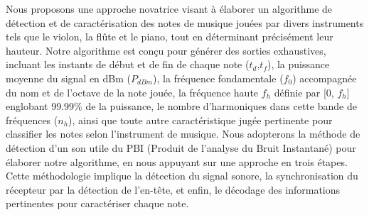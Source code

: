 Nous proposons une approche novatrice visant à élaborer un algorithme de détection et de caractérisation des notes de musique jouées par divers instruments tels que le violon, la flûte et le piano, tout en déterminant précisément leur hauteur. Notre algorithme est conçu pour générer des sorties exhaustives, incluant les instants de début et de fin de chaque note ($t_d$,$t_f$), la puissance moyenne du signal en dBm ($P_{dBm}$), la fréquence fondamentale ($f_0$) accompagnée du nom et de l’octave de la note jouée, la fréquence haute $f_h$ définie par [0, $f_h$] englobant 99.99\% de la puissance, le nombre d’harmoniques dans cette bande de fréquences ($n_h$), ainsi que toute autre caractéristique jugée pertinente pour classifier les notes selon l'instrument de musique. Nous adopterons la méthode de détection d’un son utile du PBI (Produit de l'analyse du Bruit Instantané) pour élaborer notre algorithme, en nous appuyant sur une approche en trois étapes. Cette méthodologie implique la détection du signal sonore, la synchronisation du récepteur par la détection de l'en-tête, et enfin, le décodage des informations pertinentes pour caractériser chaque note. 
